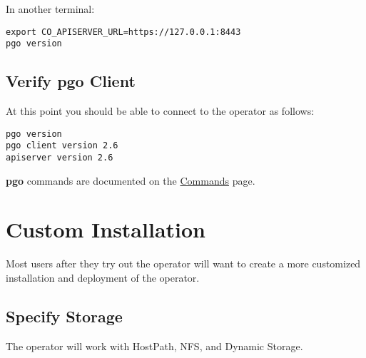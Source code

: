 \documentclass[letterpaper,12pt]{article}
\let\stdsection\section
\renewcommand\section{\newpage\stdsection}
\begin{document}
In another terminal:
\vspace{.75em}
\begin{lstlisting}
export CO_APISERVER_URL=https://127.0.0.1:8443
pgo version
\end{lstlisting}

\subsection{Verify \textbf{pgo} Client}\label{/_basic_installation/_verify_b_pgo_b_client}

At this point you should be able to connect to the operator as follows:
\vspace{.75em}
\begin{lstlisting}
pgo version
pgo client version 2.6
apiserver version 2.6
\end{lstlisting}

\textbf{pgo} commands are documented on the \href{docs/commands.asciidoc}{Commands} page.

\section{Custom Installation}\label{/_custom_installation}

Most users after they try out the operator will want to create a more customized installation and deployment of the operator.

\subsection{Specify Storage}\label{/_custom_installation/_specify_storage}

The operator will work with HostPath, NFS, and Dynamic Storage.

\end{document}

